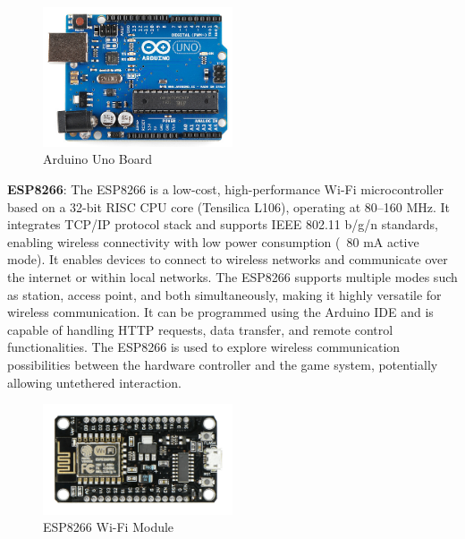 \begin{figure}[htbp!]
\centering
\includegraphics[width=0.5\textwidth]{images/fig3.2.png}
\caption{Arduino Uno Board}
\label{fig:3.2}
\end{figure}

\vspace{1.5\baselineskip} %

\textbf{ESP8266}: The ESP8266 is a low-cost, high-performance Wi-Fi microcontroller based on a 32-bit RISC CPU core (Tensilica L106), operating at 80–160 MHz. It integrates TCP/IP protocol stack and supports IEEE 802.11 b/g/n standards, enabling wireless connectivity with low power consumption (~80 mA active mode). It enables devices to connect to wireless networks and communicate over the internet or within local networks. The ESP8266 supports multiple modes such as station, access point, and both simultaneously, making it highly versatile for wireless communication. It can be programmed using the Arduino IDE and is capable of handling HTTP requests, data transfer, and remote control functionalities. The ESP8266 is used to explore wireless communication possibilities between the hardware controller and the game system, potentially allowing untethered interaction.

\begin{figure}[htbp!]
\centering
\includegraphics[width=0.5\textwidth]{images/fig3.3.jpg}
\caption{ESP8266 Wi-Fi Module}
\label{fig:3.3}
\end{figure}

\vspace{1.5\baselineskip} %

